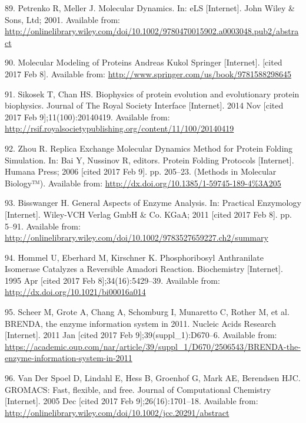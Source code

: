 \documentclass[12pt,twoside]{reedthesis}
\begin{document}
{  \hypertarget{ref-petrenko_molecular_2001}{}
  89. Petrenko R, Meller J. Molecular Dynamics. In: eLS {[}Internet{]}.
  John Wiley \& Sons, Ltd; 2001. Available from:
  \url{http://onlinelibrary.wiley.com/doi/10.1002/9780470015902.a0003048.pub2/abstract}
  
  \hypertarget{ref-kukol_molecular_2008}{}
  90. Molecular Modeling of Proteins Andreas Kukol Springer
  {[}Internet{]}. {[}cited 2017 Feb 8{]}. Available from:
  \url{http://www.springer.com/us/book/9781588298645}
  
  \hypertarget{ref-sikosek_biophysics_2014}{}
  91. Sikosek T, Chan HS. Biophysics of protein evolution and evolutionary
  protein biophysics. Journal of The Royal Society Interface
  {[}Internet{]}. 2014 Nov {[}cited 2017 Feb 9{]};11(100):20140419.
  Available from:
  \url{http://rsif.royalsocietypublishing.org/content/11/100/20140419}
  
  \hypertarget{ref-bai_replica_2006}{}
  92. Zhou R. Replica Exchange Molecular Dynamics Method for Protein
  Folding Simulation. In: Bai Y, Nussinov R, editors. Protein Folding
  Protocols {[}Internet{]}. Humana Press; 2006 {[}cited 2017 Feb 9{]}. pp.
  205--23. (Methods in Molecular Biology™). Available from:
  \url{http://dx.doi.org/10.1385/1-59745-189-4\%3A205}
  
  \hypertarget{ref-bisswanger_general_2011}{}
  93. Bisswanger H. General Aspects of Enzyme Analysis. In: Practical
  Enzymology {[}Internet{]}. Wiley-VCH Verlag GmbH \& Co. KGaA; 2011
  {[}cited 2017 Feb 8{]}. pp. 5--91. Available from:
  \url{http://onlinelibrary.wiley.com/doi/10.1002/9783527659227.ch2/summary}
  
  \hypertarget{ref-hommel_phosphoribosyl_1995}{}
  94. Hommel U, Eberhard M, Kirschner K. Phosphoribosyl Anthranilate
  Isomerase Catalyzes a Reversible Amadori Reaction. Biochemistry
  {[}Internet{]}. 1995 Apr {[}cited 2017 Feb 8{]};34(16):5429--39.
  Available from: \url{http://dx.doi.org/10.1021/bi00016a014}
  
  \hypertarget{ref-scheer_brenda_2011}{}
  95. Scheer M, Grote A, Chang A, Schomburg I, Munaretto C, Rother M, et
  al. BRENDA, the enzyme information system in 2011. Nucleic Acids
  Research {[}Internet{]}. 2011 Jan {[}cited 2017 Feb
  9{]};39(suppl\_1):D670--6. Available from:
  \url{https://academic.oup.com/nar/article/39/suppl_1/D670/2506543/BRENDA-the-enzyme-information-system-in-2011}
  
  \hypertarget{ref-van_der_spoel_gromacs_2005}{}
  96. Van Der Spoel D, Lindahl E, Hess B, Groenhof G, Mark AE, Berendsen
  HJC. GROMACS: Fast, flexible, and free. Journal of Computational
  Chemistry {[}Internet{]}. 2005 Dec {[}cited 2017 Feb
  9{]};26(16):1701--18. Available from:
  \url{http://onlinelibrary.wiley.com/doi/10.1002/jcc.20291/abstract}
  
}
\end{document}
